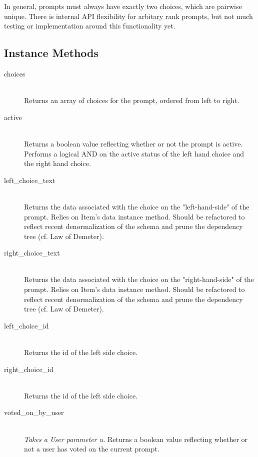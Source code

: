 \documentclass[11pt]{book}
\begin{document}
In general, prompts must always have exactly two choices, which are pairwise unique.  There is internal API flexibility for arbitary rank prompts, but not much testing or implementation around this functionality yet.

\subsection{Instance Methods}

\begin{description}
	\item[choices]  \hfill \\
  Returns an array of choices for the prompt, ordered from left to right.

  	\item[active]  \hfill \\
  \emph{}  Returns a boolean value reflecting whether or not the prompt is active.  Performs a logical AND on the active status of the left hand choice and the right hand choice.
  
  \item[left\_choice\_text]  \hfill \\
  \emph{}  Returns the data associated with the choice on the "left-hand-side" of the prompt.  Relies on Item's data instance method.  Should be refactored to reflect recent denormalization of the schema and prune the dependency tree (cf. Law of Demeter).
  
  \item[right\_choice\_text]  \hfill \\
  \emph{}  Returns the data associated with the choice on the "right-hand-side" of the prompt.  Relies on Item's data instance method.  Should be refactored to reflect recent denormalization of the schema and prune the dependency tree (cf. Law of Demeter).
  
	\item[left\_choice\_id]  \hfill \\
  Returns the id of the left side choice.
  
  
	\item[right\_choice\_id]  \hfill \\
  Returns the id of the left side choice.
 
 
  \item[voted\_on\_by\_user]  \hfill \\
  \emph{Takes a User parameter u.}  Returns a boolean value reflecting whether or not a user has voted on the current prompt.
  
\end{description}  
  
\end{document}
